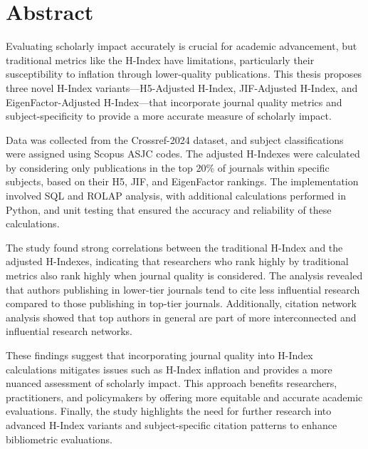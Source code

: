\chapter*{\centering Abstract}
Evaluating scholarly impact accurately is crucial for academic advancement, but traditional metrics
like the H-Index have limitations, particularly their susceptibility to inflation through
lower-quality publications.  This thesis proposes three novel H-Index variants—H5-Adjusted H-Index,
JIF-Adjusted H-Index, and EigenFactor-Adjusted H-Index—that incorporate journal quality metrics
and subject-specificity to provide a more accurate measure of scholarly impact.

Data was collected from the Crossref-2024 dataset, and subject classifications
were assigned using Scopus ASJC codes. The adjusted H-Indexes were calculated
by considering only publications in the top 20\% of journals within specific
subjects, based on their H5, JIF, and EigenFactor rankings. The implementation
involved SQL and ROLAP analysis, with additional calculations performed in
Python, and unit testing that ensured the accuracy and reliability of these
calculations.

The study found strong correlations between the traditional H-Index and the
adjusted H-Indexes, indicating that researchers who rank highly by traditional
metrics also rank highly when journal quality is considered. The analysis
revealed that authors publishing in lower-tier journals tend to cite less
influential research compared to those publishing in top-tier journals.
Additionally, citation network analysis showed that top authors in general are
part of more interconnected and influential research networks.

These findings suggest that incorporating journal quality into H-Index
calculations mitigates issues such as H-Index inflation and provides a more
nuanced assessment of scholarly impact. This approach benefits researchers,
practitioners, and policymakers by offering more equitable and accurate
academic evaluations. Finally, the study highlights the need for further
research into advanced H-Index variants and subject-specific citation patterns
to enhance bibliometric evaluations.
